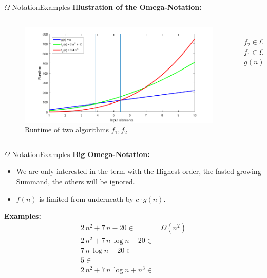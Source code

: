 \begin{frame}{$\Omega$-Notation}{Examples}
  \textbf{Illustration of the Omega-Notation:}\\[-1.0em]
  \begin{columns}
    \begin{column}{0.9\textwidth}
      \begin{figure}[!h]
        \includegraphics[width=\linewidth]{Images/OmegaNotationRuntime.png}
        \caption{Runtime of two algorithms $f_1, f_2$}
        \label{fig:omega_o_runtime_example}
      \end{figure}
    \end{column}
    \begin{column}{0.1\textwidth}
      \vspace{-4.75em}\\
      \hspace*{-2.5em}$f_2 \in \Omega(g)$\\[2.0em]
      \hspace*{-2.5em}$f_1 \in \Omega(g)$\\[2.5em]
      \hspace*{-2.5em}$g(n)$
    \end{column}
  \end{columns}
\end{frame}


\begin{frame}{$\Omega$-Notation}{Examples}
  \textbf{Big Omega-Notation:}
  \begin{itemize}
    \item
      We are only interested in the term with the Highest-order, the fasted growing Summand,
      the others will be ignored.
    \item
      $f(n)$ is limited {\color{Mittel-Blau}from underneath} by
      $c \cdot g(n)$.\\
  \end{itemize}
  \textbf{Examples:}
  \begin{align*}
    2 \, n^2 + 7 \, n - 20 \in & \,\Omega(n^2)\\
    2 \, n^2 + 7 \, n \, \log n - 20 \in & {}\\
    7 \, n \, \log n - 20 \in & {}\\
    5 \in & {}\\
    2 \, n^2 + 7 \, n \, \log n + n^3 \in & {}
  \end{align*}
\end{frame}

